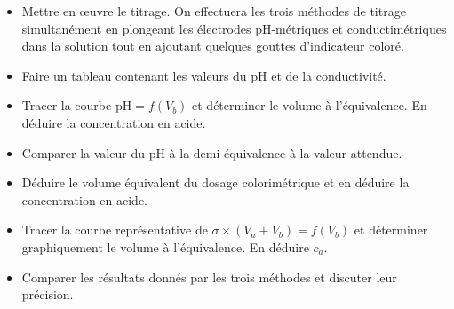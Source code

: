 \documentclass{tp}
\newcommand{\pH}{\ensuremath{\mathrm{pH}}}
\begin{document}
\begin{itemize}
\item Mettre en œuvre le titrage. On effectuera les trois méthodes de titrage simultanément en plongeant les électrodes pH-métriques et conductimétriques dans la solution tout en ajoutant quelques gouttes d'indicateur coloré.
 
\item Faire un tableau contenant les valeurs du pH et de la conductivité.

\item Tracer la courbe $\pH=f(V_b)$ et déterminer le volume à l'équivalence. En déduire la concentration en acide.

\item Comparer la valeur du pH à la demi-équivalence à la valeur attendue.

\item Déduire le volume équivalent du dosage colorimétrique et en déduire la concentration en acide.

\item Tracer la courbe représentative de $\sigma \times (V_a+V_b) = f(V_b)$ et déterminer graphiquement le volume à l'équivalence. En déduire $c_a$. 

\item Comparer les résultats donnés par les trois méthodes et discuter leur précision.
\end{itemize}
\end{document}
